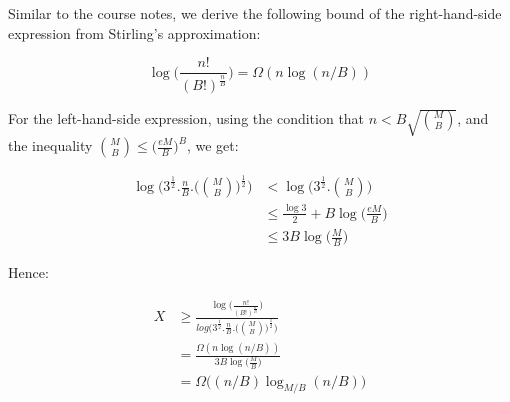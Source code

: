 Similar to the course notes, we derive the following bound of the right-hand-side expression from Stirling's approximation:

$$\log \biggl(\frac{n!}{(B!)^{\frac{n}{B}}}\bigg) = \Omega(n\log(n/B))$$

For the left-hand-side expression, using the condition that $n < B\sqrt{\binom MB}$, and the inequality $\binom MB \leq 
\big(\frac{eM}{B}\big)^B$, we get:

\begin{equation*}
  \begin{aligned}
  \log \bigg(3^\frac{1}{2}.\frac{n}{B}.\bigg(\binom MB\bigg)^\frac{1}{2} \bigg) &< \log \bigg(3^\frac{1}{2} . \binom MB \bigg) \\
  &\leq \frac{\log 3}{2} + B \log \biggl( \frac{eM}{B} \bigg) \\
  &\leq 3B \log \big(\frac{M}{B}\big)
\end{aligned}
\end{equation*}

Hence:

\begin{equation*}
  \begin{aligned}
    X &\geq \frac{\log \biggl(\frac{n!}{(B!)^{\frac{n}{B}}}\bigg)}
    {log \bigg(3^\frac{1}{2}.\frac{n}{B}.\bigg(\binom MB\bigg)^\frac{1}{2} \bigg)} \\
    & = \frac{\Omega(n\log(n/B))}{3B \log \big(\frac{M}{B}\big)} \\
    & = \Omega \big( (n/B)\log_{M/B}(n/B)\big)
\end{aligned}
\end{equation*}


